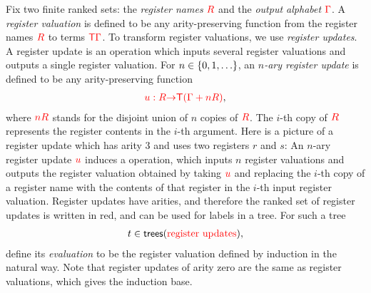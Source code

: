 Fix two finite ranked sets: the \emph{register names} ${{\color{red}{R}}}$ and the \emph{output alphabet} ${\color{red}{\Gamma}}$.
A \emph{register valuation} is defined to be any arity-preserving function from the register names ${{\color{red}{R}}}$ to terms ${\color{red}{\mathsf T}} {\color{red}{\Gamma}}$. 
To transform register valuations, we use \emph{register updates}.  A register update is an operation which inputs several  register valuations and outputs a single register valuation. For  $n \in \{0,1,\ldots\}$, an \emph{$n$-ary register update}  is defined to be any arity-preserving function
\begin{align*}
    {\color{red}{u : {{\color{red}{R}}}{\color{red}{\to}}{\color{red}{\mathsf T}}( {\color{red}{\Gamma}}+ n{{\color{red}{R}}})}},
\end{align*}
where ${\color{red}{nR}}$ stands for the disjoint union of $n$ copies of ${{\color{red}{R}}}$. The $i$-th copy of ${{\color{red}{R}}}$ represents the register contents in the $i$-th argument.
Here is a picture of a register update which has arity 3 and uses two registers $r$ and $s$:
An $n$-ary register update ${\color{red}{u}}$ induces a operation, which inputs  $n$ register valuations and  outputs the  register valuation obtained by  taking ${\color{red}{u}}$ and replacing the $i$-th copy of a register name with the  contents of that register in the $i$-th input register valuation. 
Register updates have arities, and therefore the ranked set of register updates is written in red, and can be used for labels in a tree. For such a  tree   
\begin{align*}
    t \in  \mathsf {trees}({\color{red}{\text{register updates}}}),
\end{align*}
define its \emph{evaluation} to be the register valuation defined by induction in the natural way. Note that register updates of arity zero are the same as register valuations, which gives the induction base.



